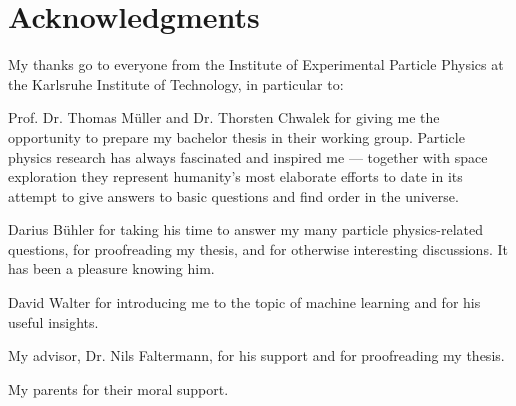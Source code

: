 \chapter*{Acknowledgments}

My thanks go to everyone from the Institute of Experimental Particle Physics at the Karlsruhe Institute of Technology, in particular to:

Prof. Dr. Thomas Müller and Dr. Thorsten Chwalek for giving me the opportunity to prepare my bachelor thesis in their working group. Particle physics research has always fascinated and inspired me --- together with space exploration they represent humanity's most elaborate efforts to date in its attempt to give answers to basic questions and find order in the universe.

Darius Bühler for taking his time to answer my many particle physics-related questions, for proofreading my thesis, and for otherwise interesting discussions. It has been a pleasure knowing him.

David Walter for introducing me to the topic of machine learning and for his useful insights.

My advisor, Dr. Nils Faltermann, for his support and for proofreading my thesis.

My parents for their moral support.